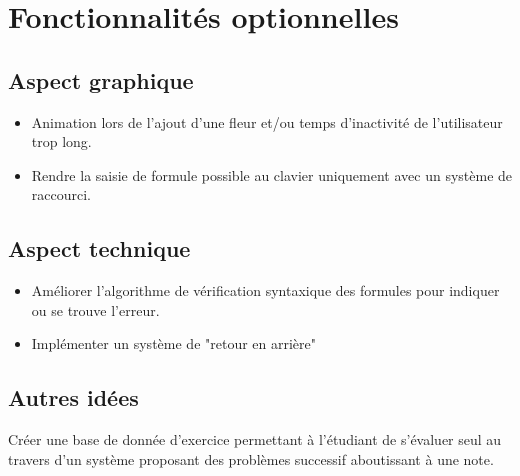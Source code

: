 \documentclass{article}
\theoremstyle{plain}
\theoremstyle{remark}
\begin{document}
\section{Fonctionnalités optionnelles}
\subsection{Aspect graphique}
\begin{itemize}
	\item Animation lors de l'ajout d'une fleur et/ou temps d'inactivité de l'utilisateur trop long.
	\item Rendre la saisie de formule possible au clavier uniquement avec un système de raccourci.
\end{itemize}
\subsection{Aspect technique}
\begin{itemize}
	\item Améliorer l'algorithme de vérification syntaxique des formules pour indiquer ou se trouve l'erreur.
	\item Implémenter un système de "retour en arrière"
\end{itemize}
\subsection{Autres idées}
Créer une base de donnée d'exercice permettant à l'étudiant de s'évaluer seul au travers d'un système proposant des problèmes successif aboutissant à une note.
\end{document}

